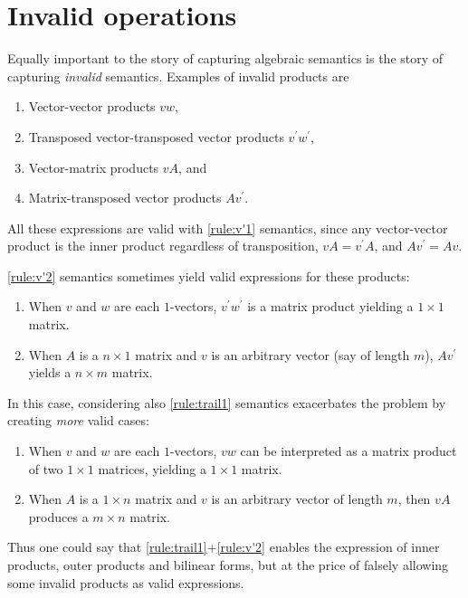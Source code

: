 

\section{Invalid operations}

Equally important to the story of capturing algebraic semantics is the story of
capturing \textit{invalid} semantics. Examples of invalid products are

\begin{enumerate}
\item Vector-vector products $vw$,
\item Transposed vector-transposed vector products $v^\prime w^\prime$,
\item Vector-matrix products $vA$, and
\item Matrix-transposed vector products $Av^\prime$.
\end{enumerate}

All these expressions are valid with \ref{rule:v'1} semantics, since any
vector-vector product is the inner product regardless of transposition,
$vA = v^\prime A$, and $Av^\prime = Av$.

\ref{rule:v'2} semantics sometimes yield valid expressions for these products:
%
\begin{enumerate}
\item When $v$ and $w$ are each $1$-vectors, $v^\prime w^\prime$ is a matrix
product yielding a $1\times 1$ matrix.
\item When $A$ is a $n\times 1$ matrix and $v$ is an arbitrary vector (say of
length $m$), $Av^\prime$ yields a $n\times m$ matrix.
\end{enumerate}
%
In this case, considering also \ref{rule:trail1} semantics
exacerbates the problem by creating \textit{more} valid cases:
%
\begin{enumerate}
\item When $v$ and $w$ are each $1$-vectors, $vw$ can be interpreted as a
matrix product of two $1\times1$ matrices, yielding a $1\times1$ matrix.
\item When $A$ is a $1\times n$ matrix and $v$ is an arbitrary vector of length
$m$, then $vA$ produces a $m\times n$ matrix.
\end{enumerate}
%
Thus one could say that \ref{rule:trail1}+\ref{rule:v'2} enables the expression
of inner products, outer products and bilinear forms, but at the price of
falsely allowing some invalid products as valid expressions.

